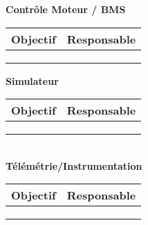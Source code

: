 \textbf{\large Contrôle Moteur / BMS}\\
\begin{tabularx}{\linewidth}{
    |>{\hsize=1.75\hsize}X|%
    >{\hsize=0.25\hsize}X|%
  }
    \hline
    \textbf{Objectif} & \textbf{Responsable} \\\hline
       & \\\hline 
       & \\\hline
       & \\\hline 
\end{tabularx}
\newline

\hfill \break
\textbf{\large Simulateur}
\\
\begin{tabularx}{\linewidth}{
    |>{\hsize=1.75\hsize}X|%
    >{\hsize=0.25\hsize}X|%
  }
    \hline
    \textbf{Objectif} & \textbf{Responsable} \\\hline
       & \\\hline 
       & \\\hline
       & \\\hline 
\end{tabularx}\\

\hfill \break
\textbf{\large Télémétrie/Instrumentation}\\
\begin{tabularx}{\linewidth}{
    |>{\hsize=1.75\hsize}X|%
    >{\hsize=0.25\hsize}X|%
  }
    \hline
    \textbf{Objectif} & \textbf{Responsable} \\\hline
       & \\\hline 
       & \\\hline
       & \\\hline 
\end{tabularx}

